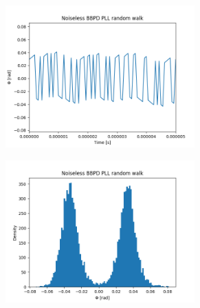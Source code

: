 	\begin{figure}[htb!]
	    \centering
	    \begin{subfigure}{0.5\textwidth}
	        \centering
	        \includegraphics[width=0.8\textwidth, angle=0]{./figs/bbpd_rw}
	    \end{subfigure}%
	    \begin{subfigure}{0.5\textwidth}
	        \centering
	        \center\includegraphics[width=0.8\textwidth, angle=0]{./figs/bbpd_rw_hist}
	    \end{subfigure}
	\end{figure}



